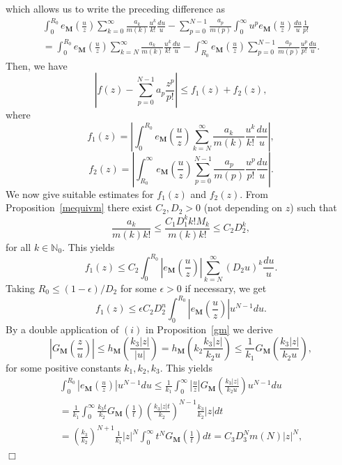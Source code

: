 \documentclass[11pt,a4paper,leqno]{article}
\theoremstyle{plain}
\theoremstyle{definition}
\newenvironment{proof1}{\medskip\par\noindent{\bf Proof}}{\hfill $\Box$
\medskip\par}
\def\N{\mathbb{N}}
\def\bM{\boldsymbol{M}}
\begin{document}
\begin{proof1}
$$$$
which allows us to write the preceding difference as
\begin{multline*}
\int_{0}^{R_0}e_{\bM}\left(\frac{u}{z}\right)\sum_{k=0}^{\infty}\frac{a_{k}}{m(k)}\frac{u^k}{k!}\frac{du}{u} -\sum_{p=0}^{N-1}\frac{a_p}{m(p)}\int_{0}^{\infty}u^{p}e_{\bM}\left(\frac{u}{z}\right)\frac{du}{u}\frac{1}{p!}\\
=\int_{0}^{R_0}e_{\bM}\left(\frac{u}{z}\right)\sum_{k=N}^{\infty}\frac{a_{k}}{m(k)}\frac{u^k}{k!}\frac{du}{u} -\int_{R_0}^{\infty}e_{\bM}\left(\frac{u}{z}\right)\sum_{p=0}^{N-1}\frac{a_p}{m(p)}\frac{u^{p}}{p!}\frac{du}{u}.
\end{multline*}
Then, we have
$$\left|f(z)-\sum_{p=0}^{N-1}a_p\frac{z^p}{p!}\right|\le f_{1}(z)+f_2(z),$$
where
$$f_{1}(z)=\left|\int_{0}^{R_0}e_{\bM}\left(\frac{u}{z}\right)\sum_{k=N}^{\infty}\frac{a_{k}}{m(k)}\frac{u^k}{k!}\frac{du}{u}\right|,$$
$$f_{2}(z)=\left|\int_{R_0}^{\infty}e_{\bM}\left(\frac{u}{z}\right)\sum_{p=0}^{N-1}\frac{a_p}{m(p)}\frac{u^{p}}{p!}\frac{du}{u}\right|.$$
We now give suitable estimates for $f_1(z)$ and $f_2(z)$.
From Proposition~\ref{mequivm} there exist $C_2,D_2>0$ (not depending on $z$) such that
\begin{equation}\label{e327}
\frac{a_{k}}{m(k)k!}\le \frac{C_1D_1^{k}k!M_k}{m(k)k!}\le C_2D_2^k,
\end{equation}
for all $k\in\N_0$. This yields
$$f_{1}(z)\le C_2\int_{0}^{R_0}\left|e_{\bM}\left(\frac{u}{z}\right)\right|\sum_{k=N}^{\infty}(D_2u)^{k}\frac{du}{u}.$$
Taking $R_0\le(1-\epsilon)/D_2$ for some $\epsilon>0$ if necessary, we get
$$f_1(z)\le \epsilon C_2D_2^{n}\int_{0}^{R_0}\left|e_{\bM}\left(\frac{u}{z}\right)\right|u^{N-1}du.$$
By a double application of $(i)$ in Proposition~\ref{gm} we derive
$$\left|G_{\bM}\left(\frac{z}{u}\right)\right|\le h_{\bM}\left(\frac{k_3|z|}{|u|}\right)=h_{\bM}\left(k_2\frac{k_3|z|}{k_2 u}\right)\le\frac{1}{k_1}G_{\bM}\left(\frac{k_3|z|}{k_2u}\right),$$
for some positive constants $k_1,k_2,k_3$. This yields
\begin{multline}\label{e337}
\int_{0}^{R_0}\left|e_{\bM}\left(\frac{u}{z}\right)\right|u^{N-1}du
\le\frac{1}{k_1}\int_{0}^{\infty}\left|\frac{u}{z}\right| G_{\bM}\left(\frac{k_3|z|}{k_2u}\right)u^{N-1}du\\
=\frac{1}{k_1}\int_{0}^{\infty}\frac{k_3t}{k_2} G_{\bM}\left(\frac{1}{t}\right)\left(\frac{k_3|z|t}{k_2}\right)^{N-1}\frac{k_3}{k_2}|z|dt\\
=\left(\frac{k_3}{k_2}\right)^{N+1}\frac{1}{k_{1}}|z|^{N} \int_{0}^{\infty}t^{N}G_{\bM}\left(\frac{1}{t}\right)dt=C_3D_3^{N}m(N)|z|^{N},

\end{multline}
\end{proof1}
\end{document}
